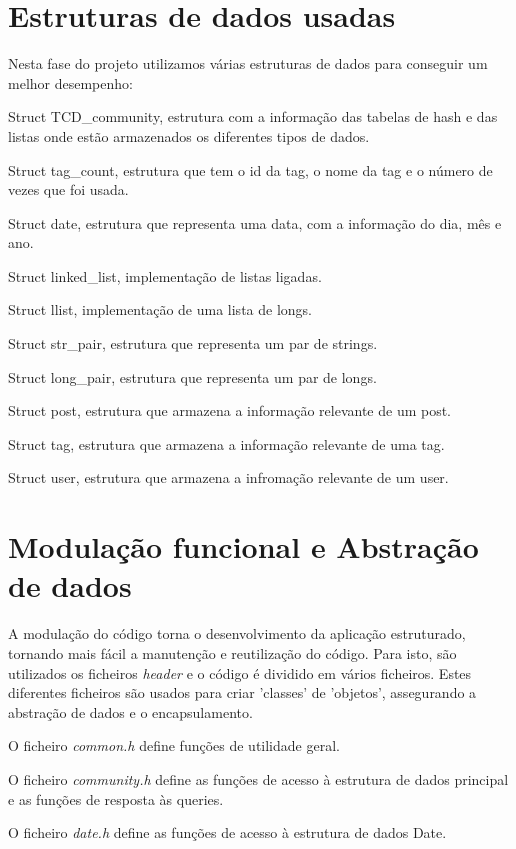 \documentclass[10pt]{report}
\newcommand\tab[1][0.5cm]{\hspace*{#1}}
\begin{document}
\section{Estruturas de dados usadas}

\tab Nesta fase do projeto utilizamos várias estruturas de dados para conseguir um melhor desempenho:

Struct TCD\_community, estrutura com a informação das tabelas de hash e das listas onde estão armazenados os diferentes tipos de dados.

Struct tag\_count, estrutura que tem o id da tag, o nome da tag e o número de vezes que foi usada.

Struct date, estrutura que representa uma data, com a informação do dia, mês e ano.

Struct linked\_list, implementação de listas ligadas.

Struct llist, implementação de uma lista de longs.

Struct str\_pair, estrutura que representa um par de strings.

Struct long\_pair, estrutura que representa um par de longs.

Struct post, estrutura que armazena a informação relevante de um post.

Struct tag, estrutura que armazena a informação relevante de uma tag.

Struct user, estrutura que armazena a infromação relevante de um user.

\section{Modulação funcional e Abstração de dados}

\tab A modulação do código torna o desenvolvimento da aplicação estruturado, tornando mais fácil a manutenção e reutilização do código. Para isto, são utilizados os ficheiros \textit{header} e o código é dividido em vários ficheiros. Estes diferentes ficheiros são usados para criar 'classes' de 'objetos', assegurando a abstração de dados e o encapsulamento.

O ficheiro \textit{common.h} define funções de utilidade geral.

O ficheiro \textit{community.h} define as funções de acesso à estrutura de dados principal e as funções de resposta às queries.

O ficheiro \textit{date.h} define as funções de acesso à estrutura de dados Date.
\end{document}
